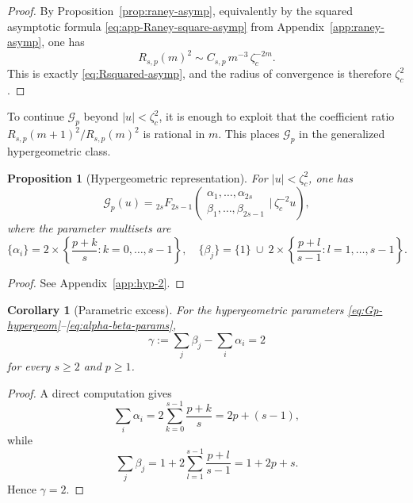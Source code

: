 \documentclass[11pt]{amsart}
\numberwithin{equation}{section}
\theoremstyle{plain}
\newtheorem{proposition}[theorem]{Proposition}
\newtheorem{corollary}[theorem]{Corollary}
\theoremstyle{definition}
\theoremstyle{remark}
\begin{document}
\begin{proof}
	By Proposition~\ref{prop:raney-asymp}, equivalently by the squared
	asymptotic formula \eqref{eq:app-Raney-square-asymp} from
	Appendix~\ref{app:raney-asymp}, one has
	\[
R_{s,p}(m)^2\sim C_{s,p}\,m^{-3}\,\zeta_c^{-2m}.
	\]
	This is exactly \eqref{eq:Rsquared-asymp}, and the radius of convergence is
	therefore \(\zeta_c^2\).
\end{proof}

To continue \(\mathcal G_p\) beyond \(|u|<\zeta_c^2\), it is enough to
exploit that the coefficient ratio
\(R_{s,p}(m+1)^2/R_{s,p}(m)^2\) is rational in \(m\). This places
\(\mathcal G_p\) in the generalized hypergeometric class.

\begin{proposition}[Hypergeometric representation]
	\label{prop:Gp-hypergeom}
	For \(|u|<\zeta_c^2\), one has
	\begin{equation}\label{eq:Gp-hypergeom}
		\mathcal G_p(u)
		=
		{}_{2s}F_{2s-1}\!\left(
		\begin{matrix}
			\alpha_1,\ldots,\alpha_{2s} \\
			\beta_1,\ldots,\beta_{2s-1}
		\end{matrix}
		\Big|\,\zeta_c^{-2}u
		\right),
	\end{equation}
	where the parameter multisets are
	\begin{equation}\label{eq:alpha-beta-params}
		\{\alpha_i\}
		=
		2\times\left\{\frac{p+k}{s}:k=0,\ldots,s-1\right\},
		\quad
		\{\beta_j\}
		=
		\{1\}\ \cup\ 2\times\left\{\frac{p+l}{s-1}:l=1,\ldots,s-1\right\}.
	\end{equation}
\end{proposition}

\begin{proof}
	See Appendix~\ref{app:hyp-2}.
\end{proof}

\begin{corollary}[Parametric excess]
	\label{cor:parametric-excess}
	For the hypergeometric parameters
	\eqref{eq:Gp-hypergeom}--\eqref{eq:alpha-beta-params},
	\[
		\gamma:=\sum_j\beta_j-\sum_i\alpha_i=2
	\]
	for every \(s\ge2\) and \(p\ge1\).
\end{corollary}

\begin{proof}
	A direct computation gives
	\[
		\sum_i\alpha_i
		=
		2\sum_{k=0}^{s-1}\frac{p+k}{s}
		=
		2p+(s-1),
	\]
	while
	\[
		\sum_j\beta_j
		=
		1+2\sum_{l=1}^{s-1}\frac{p+l}{s-1}
		=
		1+2p+s.
	\]
	Hence \(\gamma=2\).
\end{proof}
\end{document}
